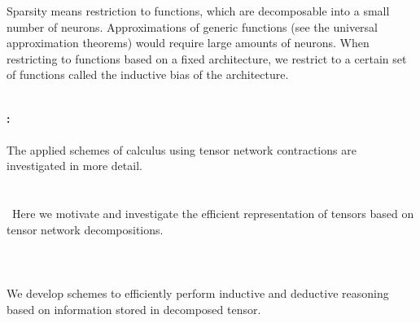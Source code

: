 Sparsity means restriction to functions, which are decomposable into a small number of neurons.
Approximations of generic functions (see the universal approximation theorems) would require large amounts of neurons. %
When restricting to functions based on a fixed architecture, we restrict to a certain set of functions called the inductive bias of the architecture.

\ \\
\textbf{: \partthreetext}\\
\ \\
The applied schemes of calculus using tensor network contractions are investigated in more detail.
\ \\
\textbf{\focusonespec}\\
\\\
Here we motivate and investigate the efficient representation of tensors based on tensor network decompositions. \\
\ \\
\textbf{\focustwospec}\\
\ \\
We develop schemes to efficiently perform inductive and deductive reasoning based on information stored in decomposed tensor.


%
%
%
%

